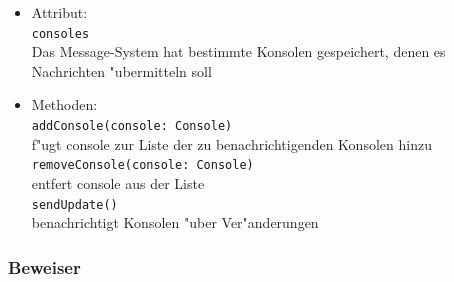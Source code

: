\documentclass[10pt,a4paper,titlepage]{article}
\begin{document}
\begin{itemize}
\begin{itemize}
\item Attribut: \\
\texttt{consoles} \\
Das Message-System hat bestimmte Konsolen gespeichert, denen es Nachrichten "ubermitteln soll 
\item Methoden: \\
\texttt{addConsole(console: Console)} \\
f"ugt console zur Liste der zu benachrichtigenden Konsolen hinzu \\
\texttt{removeConsole(console: Console)} \\
entfert console aus der Liste \\
\texttt{sendUpdate()} \\
benachrichtigt Konsolen "uber Ver"anderungen \\
\end{itemize}
\end{itemize}

\subsubsection{Beweiser}
\end{document}
